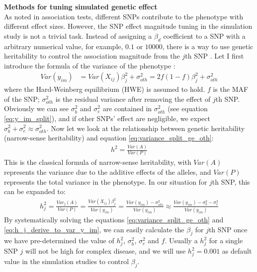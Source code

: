\documentclass[12pt]{article}
\begin{document}
\textbf{Methods for tuning simulated genetic effect}\\
As noted in association tests, different SNPs contribute to the phenotype with different effect sizes. However, the SNP effect magnitude tuning in the simulation study is not a trivial task. Instead of assigning a $\beta_d$ coefficient to a SNP with a arbitrary numerical value, for example, $0.1$ or $10000$, there is a way to use genetic heritability to control the association magnitude from the $j$th SNP \cite{Lynch1998}. Let I first introduce the formula of the variance of the phenotype  :
\begin{align}
Var(y_{im} ) & = Var(X_{ij}) \beta_j^2 + \sigma_{oth} ^ 2  = 2f(1-f) \beta_j^2 + \sigma_{oth}^2
\label{eq:variance_split_ge_oth}
\end{align}
where the Hard-Weinberg equilibrium (HWE) is assumed to hold. $f$ is the MAF of the SNP; $\sigma_{oth}^2$ is the residual variance after removing the effect of $j$th SNP. Obviously we can see $\sigma_b^2$ and $\sigma_e^2$ are contained in $\sigma_{oth}^2$ (see equation \eqref{eq:y_im_split}), and if other SNPs' effect are negligible, we expect $\sigma_b^2 + \sigma_e^2 \approx \sigma_{oth}^2$. Now let we look at the relationship between genetic heritability (narrow-sense heritability) and equation \eqref{eq:variance_split_ge_oth}:
\begin{align}
h^2 = \frac{Var(A)}{Var(P)}
\end{align}
This is the classical formula of narrow-sense heritability, with $Var(A)$ represents the variance due to the additive effects of the alleles, and $Var(P)$ represents the total variance in the phenotype. In our situation for $j$th SNP, this can be expanded to:
\begin{align}
h_j^2 = \frac{Var_j(A)}{Var(P)} = \frac{Var(X_{ij}) \beta_j^2 } {Var(y_{im} )} = \frac{Var(y_{im} ) - \sigma^2_{oth} } {Var(y_{im} )} \approx \frac{Var(y_{im} ) - \sigma_b^2 - \sigma_e^2 } {Var(y_{im} )}
\label{eq:h_j_derive_to_var_y_im}
\end{align}
By systematically solving the equations \eqref{eq:variance_split_ge_oth} and \eqref{eq:h_j_derive_to_var_y_im}, we can easily calculate the $\beta_j$ for $j$th SNP once we have pre-determined the value of $h_j^2$, $\sigma_b^2$, $\sigma_e^2$ and $f$. Usually a $h_j^2$ for a single SNP $j$ will not be high for complex disease, and we will use $h_j^2 = 0.001$ as default value in the simulation studies to control $\beta_j$.
\end{document}
